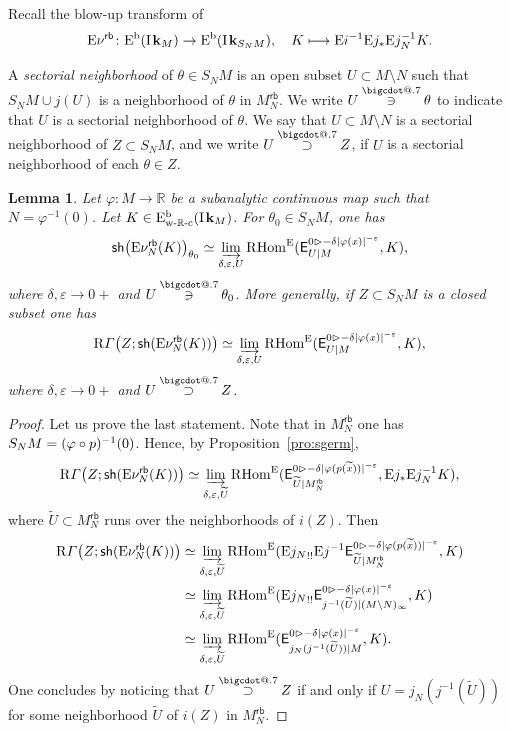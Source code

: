 \documentclass[11pt]{article}
\makeatletter
\numberwithin{equation}{section}
\newcommand\mto{\mathchoice{\longmapsto}{\mapsto}{\mapsto}{\mapsto}}
\let \tilde\oldtilde
\newcommand{\accentset}[2]{\overset{#1}{#2}}
\let\tilde\widetilde
\newcommand*\bigcdot{\mathpalette\bigcdot@{.7}}
\newcommand*\bigcdot@[2]{\mathbin{\vcenter{\hbox{\scalebox{#2}{$\m@th#1\bullet$}}}}}
\newcommand{\bdot}[1]{{\accentset{\bigcdot}{#1}}\vphantom{#1}}
\newcommand{\dotowns}{\mathbin{\bdot\owns}}
\newcommand{\dotsupset}{\mathbin{\bdot\supset}}
\newcommand{\bl}{\bigl(}
\newcommand{\br}{\bigr)}
\theoremstyle{plain}
\newtheorem{lemma}[theorem]{Lemma}
\theoremstyle{definition}
\newcommand{\R}{\mathbb{R}}
\newcommand{\derived}[1]{\mathrm{#1}}
\newcommand{\dere}{\derived{E}}\let\enh\dere
\newcommand{\derr}{\derived{R}}
\newcommand{\BEC}[2][\ifield]{\dere^{\mathrm{b}}(#1_{#2})}
\newcommand{\BECwRc}[2][\ifield]{\dere^{\mathrm{b}}_\wRc(#1_{#2})}
\newcommand{\RHom}[1][]{\derr\mathrm{Hom}_{\raise1.5ex\hbox to.1em{}#1}}
\newcommand{\FHom}{\RHom^\enh}
\newcommand{\Eopb}[1]{\enh#1^{-1}}
\newcommand{\Eoim}[1]{\enh#1_*}
\newcommand{\Eeeim}[1]{\enh#1_{!!}}
\newcommand{\Enu}{\enh\nu}
\newcommand{\wRc}{{\mathrm{w}\text-\R\text-\mathrm{c}}}
\newcommand{\field}{\mathbf{k}}\let\cor\field
\newcommand{\ind}{\mathrm{I}\mspace{2mu}}
\newcommand{\ifield}{\ind\field}
\newcommand{\inbordered}[1]{{#1_\infty}}
\let\inb \inbordered
\newcommand{\range}[2]{#1 \mathbin{\rhd} #2}
\newcommand{\rsect}{\derr\varGamma}
\newcommand{\rb}{\mathsf{rb}}
\newcommand{\sh}{\mathsf{sh}}
\newcommand{\RB}[2][N]{#2_{#1}^{\rb}}
\newcommand{\ilim}[1][]{\mathop{\varinjlim}\limits_{#1}}
\newcommand{\opb}[1]{#1^{-1}}
\makeatother
\begin{document}
Recall the blow-up transform of \cite[\S4.4]{DK19nu}
\[
\Enu^\rb\colon\BEC M \to \BEC{S_NM},\quad
K\mto \Eopb i\Eoim j\Eopb j_N K.
\]

A \emph{sectorial neighborhood} of $\theta\in S_NM$ is an open subset $U\subset M\setminus N$ such that $S_N M\cup j (U)$ is a neighborhood of $\theta$ in $\RB M$. We write $U \dotowns \theta$ to indicate that $U$ is a sectorial neighborhood of $\theta$.
We say that $U\subset M\setminus N$ is a sectorial neighborhood of $Z\subset S_NM$, and we write $U\dotsupset Z$, if $U$ is a sectorial neighborhood of each $\theta\in Z$.

\begin{lemma}\label{lem:psiphigerm}
Let $\varphi\colon M\to \R$ be a subanalytic continuous map such that
$N = \varphi^{-1}(0)$.
Let $K\in\BECwRc M$.
For $\theta_0\in S_NM$, one has
\[
\sh\bl\Enu^\rb_N(K)\br_{\theta_0} \simeq
\ilim[\delta,\varepsilon, U]
\FHom( \exx^{\range0{-\delta|\varphi(x)|^{-\varepsilon}}}_{U|M} , K),
\]
where $\delta,\varepsilon\to 0+$ and $U\dotowns \theta_0$.
More generally, if $Z\subset S_NM$ is a \emph{closed} subset one has
\[
\rsect\bl Z;\sh(\Enu^\rb_N(K))\br \simeq
\ilim[\delta,\varepsilon,U]
\FHom( \exx^{\range0{-\delta|\varphi(x)|^{-\varepsilon}}}_{U|M} , K),
\]
where $\delta,\varepsilon\to 0+$ and $U\dotsupset Z$.
\end{lemma}

\begin{proof}
Let us prove the last statement. Note that in $\RB M$ one has $S_NM = (\varphi\circ\nobreak p)^{-1}(0)$. Hence, by Proposition~\ref{pro:sgerm},
\[
\rsect\bl Z;\sh(\Enu^\rb_N(K))\br
\simeq \ilim[\delta,\varepsilon,\widetilde U]\FHom(\exx^{\range0{-\delta|\varphi(p(\tilde x))|^{-\varepsilon}}}_{\widetilde U|\RB M},\Eoim j\Eopb j_N K),
\]
where $\widetilde U\subset\RB M$ runs over the neighborhoods of $i(Z)$.
Then
\begin{align*}
\rsect\bl Z;\sh(\Enu^\rb_N(K))\br
&\simeq \ilim[\delta,\varepsilon,\widetilde U]\FHom(\Eeeim{{j_N}}\Eopb j\exx^{\range0{-\delta|\varphi(p(\tilde x))|^{-\varepsilon}}}_{\widetilde U|\RB M}, K) \\
&\simeq \ilim[\delta,\varepsilon,\widetilde U]\FHom(\Eeeim{{j_N}}\exx^{\range0{-\delta|\varphi(x)|^{-\varepsilon}}}_{\opb j(\widetilde U)|\inb{(M\setminus N)}}, K) \\
&\simeq \ilim[\delta,\varepsilon,\widetilde U]\FHom(\exx^{\range0{-\delta|\varphi(x)|^{-\varepsilon}}}_{j_N(\opb j(\widetilde U))|M},K).
\end{align*}
One concludes by noticing that $U\dotsupset Z$ if and only if $U=j_N(\opb j(\widetilde U))$ for some neighborhood $\widetilde U$ of $i(Z)$ in $\RB M$.
\end{proof}
\end{document}
